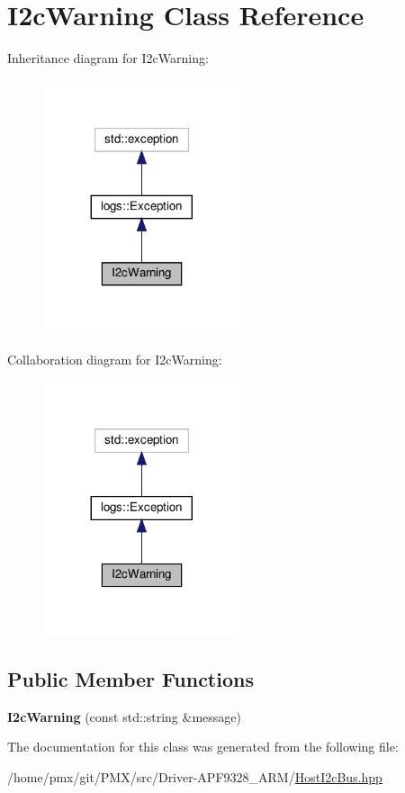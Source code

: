 \hypertarget{classI2cWarning}{}\section{I2c\+Warning Class Reference}
\label{classI2cWarning}


Inheritance diagram for I2c\+Warning\+:
\nopagebreak
\begin{figure}[H]
\begin{center}
\leavevmode
\includegraphics[width=164pt]{classI2cWarning__inherit__graph}
\end{center}
\end{figure}


Collaboration diagram for I2c\+Warning\+:
\nopagebreak
\begin{figure}[H]
\begin{center}
\leavevmode
\includegraphics[width=164pt]{classI2cWarning__coll__graph}
\end{center}
\end{figure}
\subsection*{Public Member Functions}
\begin{DoxyCompactItemize}
\item 
\mbox{\label{classI2cWarning_aa758de1566d1a306ef4e0e08f41365bb}} 
{\bfseries I2c\+Warning} (const std\+::string \&message)
\end{DoxyCompactItemize}


The documentation for this class was generated from the following file\+:\begin{DoxyCompactItemize}
\item 
/home/pmx/git/\+P\+M\+X/src/\+Driver-\/\+A\+P\+F9328\+\_\+\+A\+R\+M/\hyperlink{HostI2cBus_8hpp}{Host\+I2c\+Bus.\+hpp}\end{DoxyCompactItemize}
